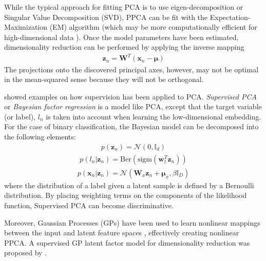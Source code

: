 While the typical approach for fitting PCA is to use eigen-decomposition or Singular Value Decomposition (SVD), PPCA can be fit with the Expectation-Maximization (EM) algorithm (which may be more computationally efficient for high-dimensional data \citep{Murphy2012}).  Once the model parameters have been estimated, dimensionality reduction can be performed by applying the inverse mapping
\begin{align}
	\bm{z}_{n} = \bm{W}^{T}(\bm{x}_{n} - \bm{\mu})
\end{align} 
\noindent
The projections onto the discovered principal axes, however, may not be optimal in the mean-squared sense because they will not be orthogonal.

\cite{Murphy2012} showed examples on how supervision has been applied to PCA.  \textit{Supervised PCA} or \textit{Bayesian factor regression} is a model like PCA, except that the target variable (or label), $l_n$ is taken into account when learning the low-dimensional embedding.  For the case of binary classification, the Bayesian model can be decomposed into the following elements:
\begin{align}
	p(\bm{z}_n) = \mathcal{N}(0,\mathbb{I}_d)
\end{align}
\begin{align}
	p(l_n|\bm{z}_n) = \text{Ber}(\text{sigm}(\bm{w}^{T}_{l}\bm{z}_n))
\end{align}
\begin{align}
	p(\bm{x}_n|\bm{z}_n) = \mathcal{N}(\bm{W}_{x}\bm{z}_{n} + \bm{\mu}_{x}, \beta\mathbb{I}_D)
\end{align}
\noindent
where the distribution of a label given a latent sample is defined by a Bernoulli distribution.  By placing weighting terms on the components of the likelihood function, Supervised PCA can become discriminative.  

Moreover, Gaussian Processes (GPs) have been used to learn nonlinear mappings between the input and latent feature spaces \citep{VanDerMaaten2009DRReview, Lawrence2005PPCAGPLVModels}, effectively creating nonlinear PPCA.  A supervised GP latent factor model for dimensionality reduction was proposed by \cite{Gao2011SupGPLVMDimRed}.

